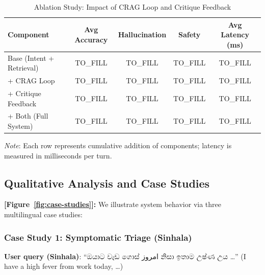 \documentclass[11pt,a4paper]{article}
\begin{document}
\begin{table}[H]
\centering
\caption{Ablation Study: Impact of CRAG Loop and Critique Feedback}
\label{tab:ablation}
\begin{tabular}{l|cccc}
\toprule
\textbf{Component} & \textbf{Avg Accuracy} & \textbf{Hallucination} & \textbf{Safety} & \textbf{Avg Latency (ms)} \\
\midrule
Base (Intent + Retrieval) & TO\_FILL & TO\_FILL & TO\_FILL & TO\_FILL \\
+ CRAG Loop & TO\_FILL & TO\_FILL & TO\_FILL & TO\_FILL \\
+ Critique Feedback & TO\_FILL & TO\_FILL & TO\_FILL & TO\_FILL \\
+ Both (Full System) & TO\_FILL & TO\_FILL & TO\_FILL & TO\_FILL \\
\bottomrule
\end{tabular}

\textit{Note}: Each row represents cumulative addition of components; latency is measured in milliseconds per turn.

\end{table}

\subsection{Qualitative Analysis and Case Studies}
\label{sec:results-qualitative}

\textbf{[Figure~\ref{fig:case-studies}]:} We illustrate system behavior via three multilingual case studies:

\subsubsection{Case Study 1: Symptomatic Triage (Sinhala)}
\textbf{User query (Sinhala)}: ``ඔයාට වැඩ ගොස් امروز නිසා ඉතාම උෂ්ණ උය \ldots'' (I have a high fever from work today, \ldots)
\end{document}
